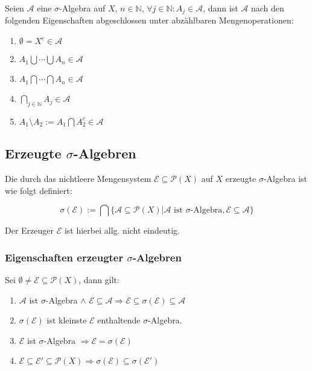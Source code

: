 Seien $\mathcal{A}$ eine $\sigma$-Algebra auf $X$, $n \in \mathbb{N}$, $\forall j \in \mathbb{N} : A_j \in \mathcal{A}$, dann ist $\mathcal{A}$ nach den folgenden Eigenschaften abgeschlossen unter abzählbaren Mengenoperationen:

\begin{enumerate}[label=(\alph*)]
	\item $\emptyset = X^c \in \mathcal{A}$
	\item $A_1 \bigcup \cdots \bigcup A_n \in \mathcal{A}$
	\item $A_1 \bigcap \cdots \bigcap A_n \in \mathcal{A}$
	\item $\bigcap_{j\in \mathbb{N}} A_j \in \mathcal{A}$
	\item $A_1 \setminus A_2 := A_1 \bigcap A_2^c \in \mathcal{A}$
\end{enumerate}

\subsection*{Erzeugte $\sigma$-Algebren}

Die durch das nichtleere Mengensystem $\mathcal{E} \subseteq \mathcal{P}(X)$ auf $X$ erzeugte $\sigma$-Algebra ist wie folgt definiert:

\vspace*{-4mm}
$$\sigma(\mathcal{E}) := \bigcap\{ \mathcal{A} \subseteq \mathcal{P}(X) | \mathcal{A} \text{ ist } \sigma \text{-Algebra}, \mathcal{E} \subseteq \mathcal{A} \}$$

Der Erzeuger $\mathcal{E}$ ist hierbei allg. nicht eindeutig.

\subsubsection*{Eigenschaften erzeugter $\sigma$-Algebren}

Sei $\emptyset \neq \mathcal{E} \subseteq \mathcal{P}(X)$, dann gilt:

\begin{enumerate}[label=(\alph*)]
	\item $\mathcal{A}$ ist $\sigma$-Algebra $\land$ $\mathcal{E} \subseteq \mathcal{A} \Rightarrow \mathcal{E} \subseteq \sigma(\mathcal{E}) \subseteq \mathcal{A}$
	\item $\sigma(\mathcal{E})$ ist kleinste $\mathcal{E}$ enthaltende $\sigma$-Algebra.
	\item $\mathcal{E}$ ist $\sigma$-Algebra $\Rightarrow \mathcal{E} = \sigma(\mathcal{E})$
	\item $\mathcal{E} \subseteq \mathcal{E}' \subseteq \mathcal{P}(X) \Rightarrow \sigma(\mathcal{E}) \subseteq \sigma(\mathcal{E}')$
\end{enumerate}

